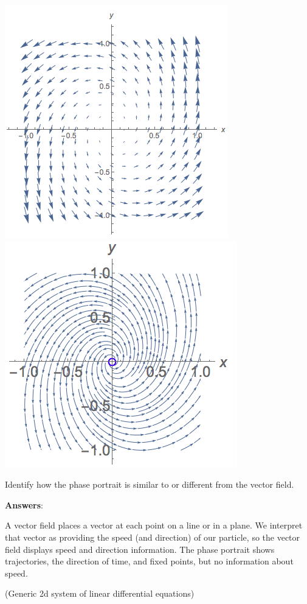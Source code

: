 \documentclass[12pt,letterpaper,noanswers]{exam}
\begin{document}
\begin{questions}
\begin{parts}
\includegraphics[width=0.5\linewidth]{img/S19-C07-2dvector.png}
\includegraphics[width=0.5\linewidth]{img/S19-C07-2dphase.png}

Identify how the phase portrait is similar to or different from the vector field.
\end{parts}

\textbf{Answers}:

A vector field places a vector at each point on a line or in a plane.  We interpret that vector as providing the speed (and direction) of our particle, so the vector field displays speed and direction information.
The phase portrait shows trajectories, the direction of time, and fixed points, but no information about speed.

\item (Generic 2d system of linear differential equations) 


\end{questions}
\end{document}
